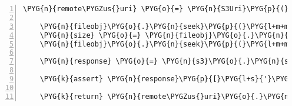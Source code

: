 \begin{Verbatim}[commandchars=\\\{\},numbers=left,firstnumber=1,stepnumber=5]
    \PYG{n}{remote\PYGZus{}uri} \PYG{o}{=} \PYG{n}{S3Uri}\PYG{p}{(}\PYG{n}{base\PYGZus{}uri} \PYG{o}{+} \PYG{n}{filename}\PYG{p}{)}

    \PYG{n}{fileobj}\PYG{o}{.}\PYG{n}{seek}\PYG{p}{(}\PYG{l+m+mi}{0}\PYG{p}{,}\PYG{l+m+mi}{2}\PYG{p}{)} \PYG{c}{\PYGZsh{} seek to end}
    \PYG{n}{size} \PYG{o}{=} \PYG{n}{fileobj}\PYG{o}{.}\PYG{n}{tell}\PYG{p}{(}\PYG{p}{)}
    \PYG{n}{fileobj}\PYG{o}{.}\PYG{n}{seek}\PYG{p}{(}\PYG{l+m+mi}{0}\PYG{p}{)} \PYG{c}{\PYGZsh{} seek to start}

    \PYG{n}{response} \PYG{o}{=} \PYG{n}{s3}\PYG{o}{.}\PYG{n}{send\PYGZus{}file\PYGZus{}multipart}\PYG{p}{(}\PYG{n}{fileobj}\PYG{p}{,} \PYG{n}{headers}\PYG{p}{,} \PYG{n}{remote\PYGZus{}uri}\PYG{p}{,} \PYG{n}{size}\PYG{p}{)}

    \PYG{k}{assert} \PYG{n}{response}\PYG{p}{[}\PYG{l+s}{'}\PYG{l+s}{status}\PYG{l+s}{'}\PYG{p}{]} \PYG{o}{==} \PYG{l+m+mi}{200}

    \PYG{k}{return} \PYG{n}{remote\PYGZus{}uri}\PYG{o}{.}\PYG{n}{public\PYGZus{}url}\PYG{p}{(}\PYG{p}{)}
\end{Verbatim}


